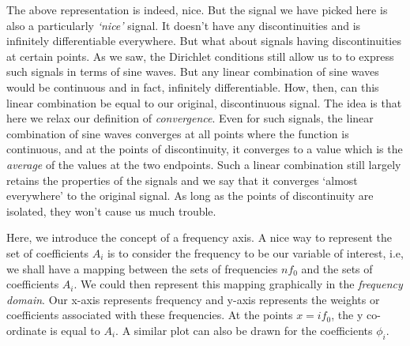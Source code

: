 \documentclass{article}
\theoremstyle{definition}
\begin{document}
	 The above representation is indeed, nice. But the signal we have picked here is also a particularly \textit{`nice'} signal. It doesn't have any discontinuities and is infinitely differentiable everywhere. But what about signals having discontinuities at certain points. As we saw, the Dirichlet conditions still allow us to to express such signals in terms of sine waves. But any linear combination of sine waves would be continuous and in fact, infinitely differentiable. How, then, can this linear combination be equal to our original, discontinuous signal. The idea is that here we relax our definition of \textit{convergence}. Even for such signals, the linear combination of sine waves converges at all points where the function is continuous, and at the points of discontinuity, it converges to a value which is the \textit{average} of the values at the two endpoints. Such a linear combination still largely retains the properties of the signals and we say that it converges `almost everywhere' to the original signal. As long as the points of discontinuity are isolated, they won't cause us much trouble. \smallskip
	 
	 Here, we introduce the concept of a frequency axis. A nice way to represent the set of coefficients $A_i$ is to consider the frequency to be our variable of interest, i.e, we shall have a mapping between the sets of frequencies $nf_0$ and the sets of coefficients $A_i$. We could then represent this mapping graphically in the \textit{frequency domain}. Our x-axis represents frequency and y-axis represents the weights or coefficients associated with these frequencies. At the points $x= if_0$, the y co-ordinate is equal to $A_i$. A similar plot can also be drawn for the coefficients $\phi_i$. 
	 
\end{document}

